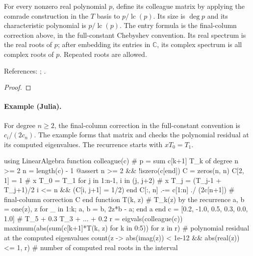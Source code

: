 \begin{theorem}
\label{thm:chebyshev-colleague}
\leanok
For every nonzero real polynomial $p$, define its colleague matrix by applying
the comrade construction in the $T$ basis to $p/\operatorname{lc}(p)$.
Its size is $\deg p$ and its characteristic polynomial is $p/\operatorname{lc}(p)$.
The entry formula is the final-column correction above, in the full-constant
Chebyshev convention. Its real spectrum is the real roots of $p$; after
embedding its entries in $\mathbb C$, its complex spectrum is all complex roots
of $p$. Repeated roots are allowed.

References: \cite{good-colleague}; \cite[Theorem 18.1]{atap}.
\end{theorem}
\begin{proof}
\leanok
\end{proof}

\paragraph{Example (Julia).} For degree $n\ge2$, the final-column correction in the full-constant convention is $c_i/(2c_n)$. The example forms that matrix and checks the polynomial residual at its computed eigenvalues. The recurrence starts with $xT_0=T_1$.

\begin{juliacode}
using LinearAlgebra
function colleague(c)               # p = sum c[k+1] T_k of degree n >= 2
    n = length(c) - 1
    @assert n >= 2 && !iszero(c[end])
    C = zeros(n, n)
    C[2, 1] = 1                     # x T_0 = T_1
    for j in 1:n-1, i in (j, j+2)   # x T_j = (T_{j-1} + T_{j+1})/2
        i <= n && (C[i, j+1] = 1/2)
    end
    C[:, n] .-= c[1:n] ./ (2c[n+1]) # final-column correction
    C
end
function T(k, z)                    # T_k(z) by the recurrence
    a, b = one(z), z
    for _ in 1:k; a, b = b, 2z*b - a; end
    a
end
c = [0.2, -1.0, 0.5, 0.3, 0.0, 1.0] # T_5 + 0.3 T_3 + ... + 0.2
r = eigvals(colleague(c))
maximum(abs(sum(c[k+1]*T(k, z) for k in 0:5)) for z in r)  # polynomial residual at the computed eigenvalues
count(z -> abs(imag(z)) < 1e-12 && abs(real(z)) <= 1, r)   # number of computed real roots in the interval
\end{juliacode}

